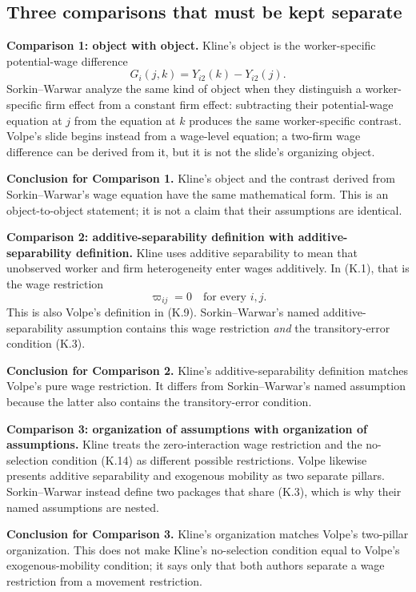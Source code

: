 \documentclass[11pt]{article}
\begin{document}
\subsection{Three comparisons that must be kept separate}

\textbf{Comparison 1: object with object.}
Kline's object is the worker-specific potential-wage difference
\[
G_i(j,k)=Y_{i2}(k)-Y_{i2}(j).
\]
Sorkin--Warwar analyze the same kind of object when they distinguish a
worker-specific firm effect from a constant firm effect: subtracting their
potential-wage equation at \(j\) from the equation at \(k\) produces the
same worker-specific contrast.  Volpe's slide begins instead from a
wage-level equation; a two-firm wage difference can be derived from it, but
it is not the slide's organizing object.

\textbf{Conclusion for Comparison 1.}
Kline's object and the contrast derived from Sorkin--Warwar's wage equation
have the same mathematical form.  This is an object-to-object statement; it
is not a claim that their assumptions are identical.

\textbf{Comparison 2: additive-separability definition with
additive-separability definition.}
Kline uses additive separability to mean that unobserved worker and firm
heterogeneity enter wages additively.  In (K.1), that is the wage restriction
\[
\varpi_{ij}=0
\quad\text{for every }i,j.
\]
This is also Volpe's definition in (K.9).  Sorkin--Warwar's named
additive-separability assumption contains this wage restriction
\emph{and} the transitory-error condition (K.3).

\textbf{Conclusion for Comparison 2.}
Kline's additive-separability definition matches Volpe's pure wage
restriction.  It differs from Sorkin--Warwar's named assumption because the
latter also contains the transitory-error condition.

\textbf{Comparison 3: organization of assumptions with organization of
assumptions.}
Kline treats the zero-interaction wage restriction and the no-selection
condition (K.14) as different possible restrictions.  Volpe likewise
presents additive separability and exogenous mobility as two separate
pillars.  Sorkin--Warwar instead define two packages that share (K.3), which
is why their named assumptions are nested.

\textbf{Conclusion for Comparison 3.}
Kline's organization matches Volpe's two-pillar organization.  This does not
make Kline's no-selection condition equal to Volpe's exogenous-mobility
condition; it says only that both authors separate a wage restriction from a
movement restriction.
\end{document}
